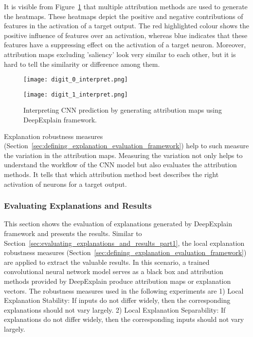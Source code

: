 \documentclass[english]{tktltiki2}
\theoremstyle{definition}
\theoremstyle{remark}
\begin{document}
It is visible from Figure~\ref{fig:interpreting_CNN_using_DeepExplain} that multiple attribution methods are used to generate the heatmaps. These heatmaps depict the positive and negative contributions of features in the activation of a target output. The red highlighted colour shows the positive influence of features over an activation, whereas blue indicates that these features have a suppressing effect on the activation of a target neuron. Moreover, attribution maps excluding 'saliency' look very similar to each other, but it is hard to tell the similarity or difference among them. 

\begin{figure}[H]
	\vspace*{0mm}
	\centering
	\texttt{[image: digit\_0\_interpret.png]}
\end{figure}

\begin{figure}[H]
	\vspace*{-10 mm}
	\centering
	\texttt{[image: digit\_1\_interpret.png]}
	\caption{Interpreting CNN prediction by generating attribution maps using DeepExplain framework.}%
	\label{fig:interpreting_CNN_using_DeepExplain}%
\end{figure}
 
Explanation robustness measures (Section~\ref{sec:defining_explanation_evaluation_framework}) help to such measure the variation in the attribution maps. Measuring the variation not only helps to understand the workflow of the CNN model but also evaluates the attribution methods. It tells that which attribution method best describes the right activation of neurons for a target output.

\subsubsection{Evaluating Explanations and Results}\label{sec:CNN_evaluating_explnations_and_resuls}
This section shows the evaluation of explanations generated by DeepExplain framework and presents the results. Similar to Section~\ref{sec:evaluating_explanations_and_results_part1}, the local explanation robustness measures (Section~\ref{sec:defining_explanation_evaluation_framework}) are applied to extract the valuable results. In this scenario, a trained convolutional neural network model serves as a black box and attribution methods provided by DeepExplain produce attribution maps or explanation vectors. The robustness measures used in the following experiments are 1) Local Explanation Stability: If inputs do not differ widely, then the corresponding explanations should not vary largely. 2) Local Explanation Separability: If explanations do not differ widely, then the corresponding inputs should not vary largely.
\end{document}
